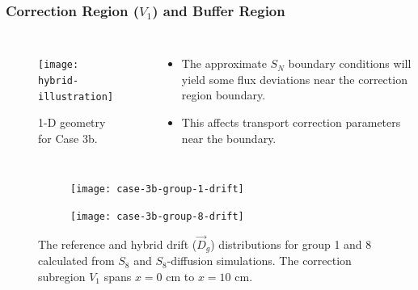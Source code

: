 \begin{frame}
  \frametitle{Correction Region ($V_1$) and Buffer Region}

  \begin{columns}
    \column{5.5cm}
    \begin{figure}[htb!]
      \centering
      \texttt{[image: hybrid-illustration]}
      \caption{1-D geometry for Case 3b.}
      \label{fig:3b-geometry}
    \end{figure}
    \column{5.5cm}
    \begin{itemize}
      \item The approximate $S_N$ boundary conditions will yield some flux deviations near the correction
    region boundary.
      \item This affects transport correction parameters near the boundary.
    \end{itemize}
  \end{columns}
  \begin{figure}[htb!]
      \centering
      \begin{subfigure}[t]{.46\textwidth}
          \centering
          \texttt{[image: case-3b-group-1-drift]}
      \end{subfigure}
      \hfill
      \begin{subfigure}[t]{.46\textwidth}
          \centering
          \texttt{[image: case-3b-group-8-drift]}
      \end{subfigure}
      \caption{The reference and hybrid drift ($\vec{D}_g$) distributions for group 1 and 8 calculated
        from $S_8$ and $S_8$-diffusion simulations. The correction subregion $V_1$ spans $x=0$ cm to
        $x=10$ cm.}
      \label{fig:3b-drift-1}
  \end{figure}
\end{frame}

